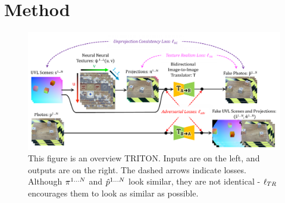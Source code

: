 \documentclass{article}
\begin{document}
\section{Method} \label{sec:method}
	\begin{figure}[thbp]
	    \vspace{-20pt}
		\begin{center}
			\includegraphics[width=\textwidth]{../images/main_diagram_beautiful.pdf}
		\end{center}
		\vspace{-10pt}
		\caption{
			This figure is an overview TRITON.
			Inputs are on the left, and outputs are on the right.
			The dashed arrows indicate losses.
			Although $\pi^{1\dots N}$ and $\hat{p}^{1\dots N}$ look similar, they are not identical - $\ell_{TR}$ encourages them to look as similar as possible.
		}
		\label{fig:main_diagram}
	\end{figure}
\end{document}
